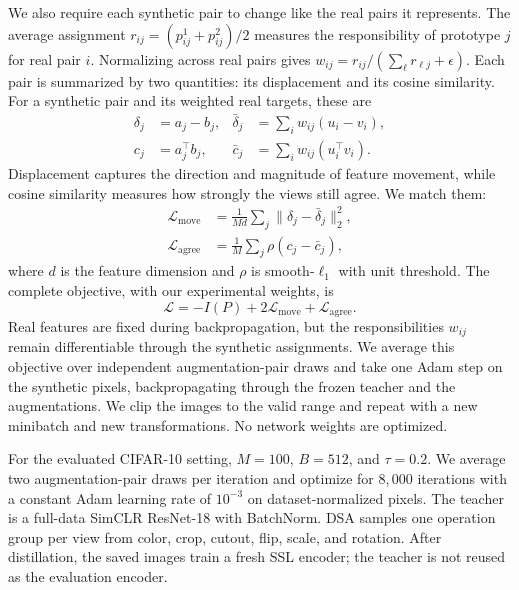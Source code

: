 We also require each synthetic pair to change like the real pairs it represents.
The average assignment $r_{ij}=(p^1_{ij}+p^2_{ij})/2$ measures the responsibility
of prototype $j$ for real pair $i$. Normalizing across real pairs gives
$w_{ij}=r_{ij}/(\sum_{\ell}r_{\ell j}+\epsilon)$.
Each pair is summarized by two quantities: its displacement and its cosine
similarity. For a synthetic pair and its weighted real targets, these are
\begin{equation}
\begin{aligned}
 \delta_j &= a_j-b_j,
 &\bar\delta_j &= \sum_i w_{ij}(u_i-v_i),\\
 c_j &= a_j^\top b_j,
 &\bar c_j &= \sum_i w_{ij}(u_i^\top v_i).
\end{aligned}
\label{eq:vt_targets}
\end{equation}
Displacement captures the direction and magnitude of feature movement, while
cosine similarity measures how strongly the views still agree. We match them:
\begin{equation}
\begin{aligned}
 \mathcal{L}_{\mathrm{move}}
 &=\frac{1}{Md}\sum_j\|\delta_j-\bar\delta_j\|_2^2,\\
 \mathcal{L}_{\mathrm{agree}}
 &=\frac{1}{M}\sum_j\rho(c_j-\bar c_j),
\end{aligned}
\label{eq:vt_matching}
\end{equation}
where $d$ is the feature dimension and $\rho$ is smooth-$\ell_1$ with unit
threshold. The complete objective, with our experimental weights, is
\begin{equation}
 \boxed{\mathcal{L}=-I(P)+2\mathcal{L}_{\mathrm{move}}
                         +\mathcal{L}_{\mathrm{agree}}.}
\label{eq:vt_objective}
\end{equation}
Real features are fixed during backpropagation, but the responsibilities
$w_{ij}$ remain differentiable through the synthetic assignments. We average
this objective over independent augmentation-pair draws and take one Adam step
on the synthetic pixels, backpropagating through the frozen teacher and the
augmentations. We clip the images to the valid range and repeat with a new
minibatch and new transformations. No network weights are optimized.

For the evaluated CIFAR-10 setting, $M=100$, $B=512$, and $\tau=0.2$.
We average two augmentation-pair draws per iteration and optimize for
$8{,}000$ iterations with a constant Adam learning rate of $10^{-3}$ on
dataset-normalized pixels. The teacher is a full-data SimCLR ResNet-18 with
BatchNorm. DSA samples one operation group per view from color, crop, cutout,
flip, scale, and rotation. After distillation, the saved images train a fresh
SSL encoder; the teacher is not reused as the evaluation encoder.
